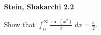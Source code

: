 \textbf{Stein, Shakarchi 2.2}

Show that $ \int_{0}^{\infty}{\frac{\sin{\left( x^2 \right)}}{x} \; dx} = \frac{\pi}{2}.$

\begin{solution}
    \ \\
\end{solution}